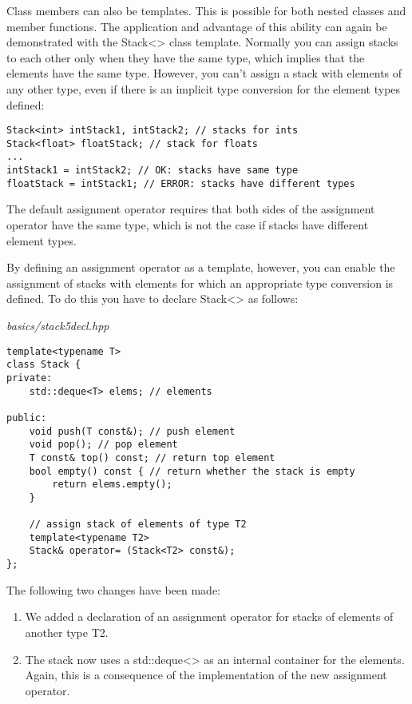 
Class members can also be templates. This is possible for both nested classes and member functions. The application and advantage of this ability can again be demonstrated with the Stack<> class template. Normally you can assign stacks to each other only when they have the same type, which implies that the elements have the same type. However, you can’t assign a stack with elements of any other type, even if there is an implicit type conversion for the element types defined:

\begin{lstlisting}[style=styleCXX]
Stack<int> intStack1, intStack2; // stacks for ints
Stack<float> floatStack; // stack for floats
...
intStack1 = intStack2; // OK: stacks have same type
floatStack = intStack1; // ERROR: stacks have different types
\end{lstlisting}

The default assignment operator requires that both sides of the assignment operator have the same type, which is not the case if stacks have different element types.

By defining an assignment operator as a template, however, you can enable the assignment of stacks with elements for which an appropriate type conversion is defined. To do this you have to declare Stack<> as follows:

\noindent
\textit{basics/stack5decl.hpp}
\begin{lstlisting}[style=styleCXX]
template<typename T>
class Stack {
private:
	std::deque<T> elems; // elements
	
public:
	void push(T const&); // push element
	void pop(); // pop element
	T const& top() const; // return top element
	bool empty() const { // return whether the stack is empty
		return elems.empty();
	}
	
	// assign stack of elements of type T2
	template<typename T2>
	Stack& operator= (Stack<T2> const&);
};
\end{lstlisting}

The following two changes have been made:

\begin{enumerate}
\item 
We added a declaration of an assignment operator for stacks of elements of another type T2.

\item 
The stack now uses a std::deque<> as an internal container for the elements. Again, this is a consequence of the implementation of the new assignment operator.
\end{enumerate}

